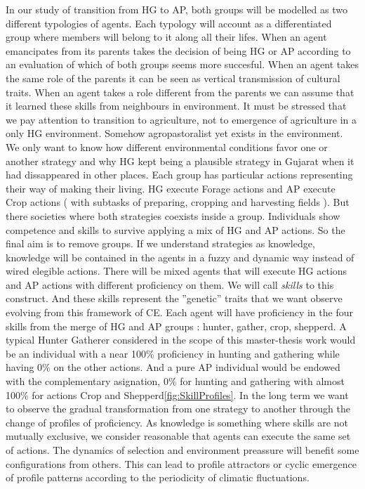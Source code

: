 \documentclass[11pt,oneside,a4paper,openright]{report}
\begin{document}
In our study of transition from HG to AP, both groups will be modelled as two different typologies of agents. Each typology will account as a differentiated group where members will belong to it along all their lifes. When an agent emancipates from its parents takes the decision of being HG or AP according to an evaluation of which of both groups seems more succesful. When an agent takes the same role of the parents it can be seen as vertical transmission of cultural traits. When an agent takes a role different from the parents we can assume that it learned these skills from neighbours in environment. It must be stressed that we pay attention to transition to agriculture, not to emergence of agriculture in a only HG environment. Somehow agropastoralist yet exists in the environment. We only want to know how different environmental conditions favor one or another strategy and why HG kept being a plausible strategy in Gujarat when it had dissappeared in other places.
Each group has particular actions representing their way of making their living. HG execute Forage actions and AP execute Crop actions ( with subtasks of preparing, cropping and harvesting fields ). But there societies where both strategies coexists inside a group. Individuals show competence and skills to survive applying a mix of HG and AP actions. So the final aim is to remove groups. If we understand strategies as knowledge, knowledge will be contained in the agents in a fuzzy and dynamic way instead of wired elegible actions. There will be mixed agents that will execute HG actions and AP actions with different proficiency on them. We will call \emph{skills} to this construct. And these skills represent the ''genetic'' traits that we want observe evolving from this framework of CE. Each agent will have proficiency in the four skills from the merge of HG and AP groups : hunter, gather, crop, shepperd. A typical Hunter Gatherer considered in the scope of this master-thesis work would be an individual with a near 100\% proficiency in hunting and gathering while having 0\% on the other actions. And a pure AP individual would be endowed with the complementary asignation, 0\% for hunting and gathering with almost 100\% for actions Crop and Shepperd\ref{fig:SkillProfiles}. In the long term we want to observe the gradual transformation from one strategy to another through the change of profiles of proficiency. As knowledge is something where skills are not mutually exclusive, we consider reasonable that agents can execute the same set of actions. The dynamics of selection and environment preassure will benefit some configurations from others. This can lead to profile attractors or cyclic emergence of profile patterns according to the periodicity of climatic fluctuations.
\end{document}
